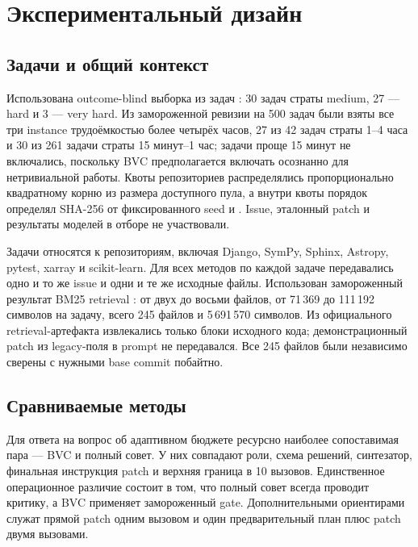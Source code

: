 \documentclass[11pt]{article}
\begin{document}
\section{Экспериментальный дизайн}

\subsection{Задачи и общий контекст}

Использована outcome-blind выборка из \NTasks{} задач \dataset{}
\cite{jimenez2024swebench,openai2024verified}: 30 задач страты medium,
27 --- hard и 3 --- very hard. Из замороженной ревизии на 500 задач были
взяты все три instance трудоёмкостью более четырёх часов, 27 из 42 задач
страты 1--4 часа и 30 из 261 задачи страты 15 минут--1 час; задачи проще
15 минут не включались, поскольку BVC предполагается включать осознанно для
нетривиальной работы. Квоты репозиториев распределялись пропорционально
квадратному корню из размера доступного пула, а внутри квоты порядок
определял SHA-256 от фиксированного seed и . Issue,
эталонный patch и результаты моделей в отборе не участвовали.

Задачи относятся к \NRepos{} репозиториям, включая Django, SymPy, Sphinx,
Astropy, pytest, xarray и scikit-learn. Для всех методов по каждой задаче
передавались одно и то же issue и одни и те же исходные файлы. Использован
замороженный результат BM25 retrieval \cite{robertson2009bm25}: от двух до
восьми файлов, от 71\,369 до 111\,192 символов на задачу, всего 245 файлов
и 5\,691\,570 символов. Из официального retrieval-артефакта извлекались
только блоки исходного кода; демонстрационный patch из legacy-поля
 в prompt не передавался. Все 245 файлов были независимо сверены
с нужными base commit побайтно.

\subsection{Сравниваемые методы}

Для ответа на вопрос об адаптивном бюджете ресурсно наиболее сопоставимая
пара --- BVC и полный совет. У них совпадают роли, схема решений, синтезатор,
финальная инструкция patch и верхняя граница в 10 вызовов. Единственное
операционное различие состоит в том, что полный совет всегда проводит
критику, а BVC применяет замороженный gate. Дополнительными ориентирами
служат прямой patch одним вызовом и один предварительный план плюс patch
двумя вызовами.
\end{document}
